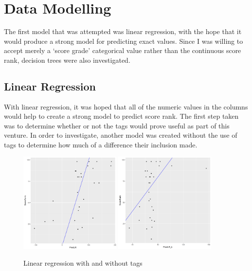 \documentclass[models.tex]{subfiles}
\begin{document}
\section{Data Modelling} %
\label{sec:models}
The first model that was attempted was linear regression, with the hope that it
would produce a strong model for predicting exact values. Since I was willing to
accept merely a `score grade' categorical value rather than the continuous score
rank, decision trees were also investigated.

\subsection{Linear Regression} %
\label{sub:linear_regression}
With linear regression, it was hoped that all of the numeric values in the
columns would help to create a strong model to predict score rank. The first
step taken was to determine whether or not the tags would prove useful as part
of this venture. In order to investigate, another model was created without the
use of tags to determine how much of a difference their inclusion made.

\begin{figure}[H]
    \centering
    \includegraphics[width=0.45\textwidth]{img/pred.png}
    \includegraphics[width=0.45\textwidth]{img/pred_b.png}
    \caption{Linear regression with and without tags}
\end{figure}
\end{document}
